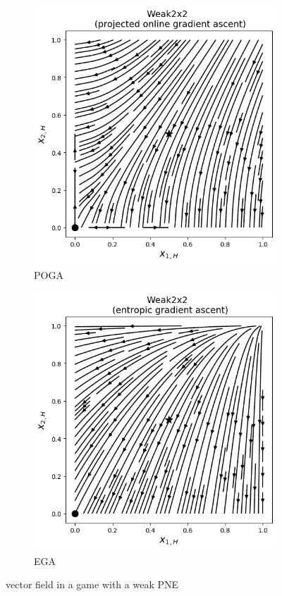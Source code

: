 \begin{figure}[H]
\captionsetup{justification=centering}
\centering
\begin{subfigure}{.5\textwidth}
    \centering
    \includegraphics[width=\textwidth]{logos/Weak2x2-1.png}
    \caption{POGA}
    \label{fig:Weak2x2-1a}
\end{subfigure}%
\begin{subfigure}{.5\textwidth}
    \centering
    \includegraphics[width=\textwidth]{logos/Weak2x2-2.png}
    \caption{EGA}
    \label{fig:Weak2x2-1b}
\end{subfigure}
\caption{vector field in a game with a weak PNE}
\label{fig:Weak2x2-1}
\end{figure}

